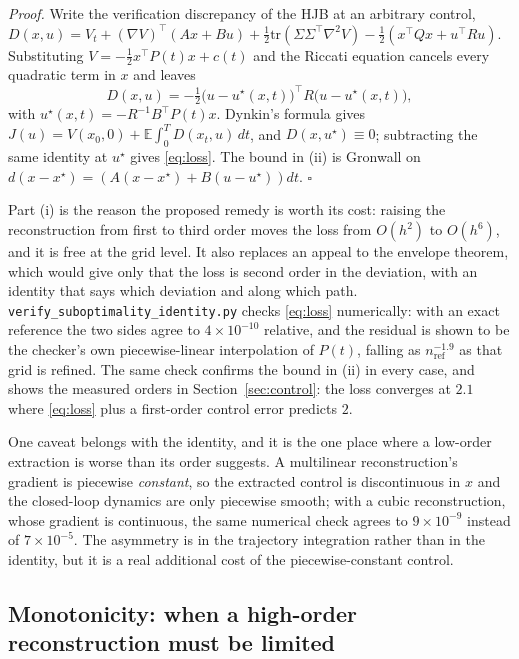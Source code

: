 \documentclass[conference]{IEEEtran}
\begin{document}
\emph{Proof.} Write the verification discrepancy of the HJB at an arbitrary control,
$D(x,u) = V_t + (\nabla V)^\top(Ax+Bu) + \tfrac12\mathrm{tr}(\Sigma\Sigma^\top\nabla^2V)
- \tfrac12(x^\top Qx + u^\top Ru)$. Substituting $V = -\tfrac12 x^\top P(t)x + c(t)$ and the
Riccati equation cancels every quadratic term in $x$ and leaves
\begin{equation}
D(x,u) = -\tfrac{1}{2}\big(u - u^\star(x,t)\big)^\top R \big(u - u^\star(x,t)\big),
\end{equation}
with $u^\star(x,t) = -R^{-1}B^\top P(t)x$. Dynkin's formula gives
$J(u) = V(x_0,0) + \mathbb{E}\int_0^T D(x_t,u)\,dt$, and $D(x,u^\star)\equiv 0$; subtracting the
same identity at $u^\star$ gives \eqref{eq:loss}. The bound in (ii) is Gronwall on
$d(x-x^\star) = (A(x-x^\star) + B(u-u^\star))dt$. $\square$

Part (i) is the reason the proposed remedy is worth its cost: raising the reconstruction from first
to third order moves the loss from $O(h^2)$ to $O(h^6)$, and it is free at the grid level. It also
replaces an appeal to the envelope theorem, which would give only that the loss is second order in
the deviation, with an identity that says which deviation and along which path.
\texttt{verify\_suboptimality\_identity.py} checks \eqref{eq:loss} numerically: with an exact
reference the two sides agree to $4\times10^{-10}$ relative, and the residual is shown to be the
checker's own piecewise-linear interpolation of $P(t)$, falling as $n_{\text{ref}}^{-1.9}$ as that
grid is refined. The same check confirms the bound in (ii) in every case, and shows the measured
orders in Section~\ref{sec:control}: the loss converges at $2.1$ where \eqref{eq:loss} plus a
first-order control error predicts $2$.

One caveat belongs with the identity, and it is the one place where a low-order extraction is worse
than its order suggests. A multilinear reconstruction's gradient is piecewise \emph{constant}, so the
extracted control is discontinuous in $x$ and the closed-loop dynamics are only piecewise smooth;
with a cubic reconstruction, whose gradient is continuous, the same numerical check agrees to
$9\times10^{-9}$ instead of $7\times10^{-5}$. The asymmetry is in the trajectory integration rather
than in the identity, but it is a real additional cost of the piecewise-constant control.

\subsection{Monotonicity: when a high-order reconstruction must be limited}\label{sec:mono}
\end{document}
